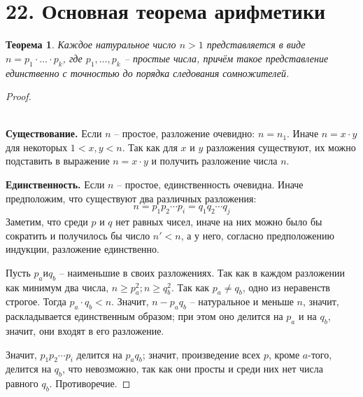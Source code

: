\documentclass[a4paper,12pt]{article}
\newtheorem*{theorem}{Теорема}
\begin{document}
        \section*{22. Основная теорема арифметики}
            \begin{theorem}
                Каждое натуральное число $n >1 $ представляется в виде $n=p_1\cdot\ldots\cdot p_k$, где $p_1,\ldots,p_k$ -- простые числа, причём такое представление единственно с точностью до порядка следования сомножителей.
            \end{theorem}
            \begin{proof}\ \\
            \ 
            
            \textbf{Существование.} Если $n$ -- простое, разложение очевидно: $n = n_{1}$. Иначе $n = x \cdot y$ для некоторых $1 < x,y < n$. Так как для $x$ и $y$ разложения существуют, их можно подставить в выражение $n = x \cdot y$ и получить разложение числа $n$.


            \textbf{Единственность.} Если $n$ -- простое, единственность очевидна. Иначе предположим, что существуют два различных разложения:
            \[
                n = p_{1}p_{2} \cdots p_{i} = q_{1}q_{2} \cdots q_{j}
            \]
            Заметим, что среди $p$ и $q$ нет равных чисел, иначе на них можно было бы сократить и получилось бы число $n' < n$, а у него, согласно предположению индукции, разложение единственно.
            
            Пусть $p_{a} и q_{b}$ -- наименьшие в своих разложениях. Так как в каждом разложении как минимум два числа, $n \geqslant p^{2}_{a}; n \geqslant q_{b}^{2}$. Так как $p_{a} \ne q_{b}$, одно из неравенств строгое. Тогда $p_{a} \cdot q_{b} < n$. Значит, $n - p_{a}q_{b}$ -- натуральное и меньше $n$, значит, раскладывается единственным образом; при этом оно делится на $p_{a}$ и на $q_{b}$, значит, они входят в его разложение.
            
            Значит, $p_{1}p_{2} \cdots p_{i}$ делится на $p_{a}q_{b}$; значит, произведение всех $p$, кроме $a$-того, делится на $q_{b}$, что невозможно, так как они просты и среди них нет числа равного $q_{b}$. Противоречие.
            \end{proof}
\end{document}
